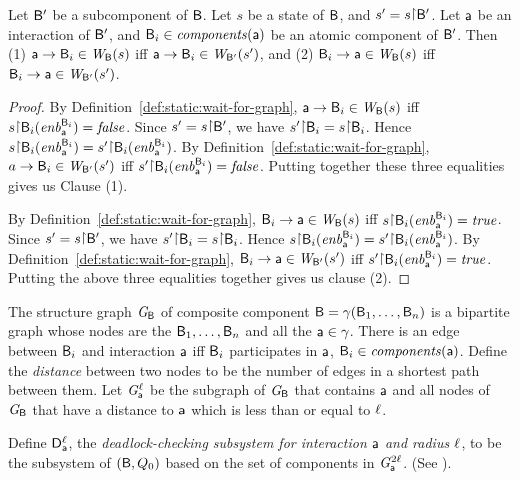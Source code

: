 \begin{proposition} \label{prop:edge-projection}
Let $\mathsf{B}'$ be a subcomponent of $\mathsf{B}$. Let $s$ be a state of
$\mathsf{B}$, and $s' = s \pj \B'$.  Let $\mathsf{a}$ be an interaction of
$\mathsf{B}'$, and $\mathsf{B}_i \in \mathit{components}(\mathsf{a})$ be an atomic component of
$\mathsf{B}'$.  Then (1) $\mathsf{a} \rightarrow \mathsf{B}_i \in \mathit{W}_{\mathsf{B}}({s})$ iff
$\mathsf{a} \rightarrow \mathsf{B}_i \in \mathit{W}_{\mathsf{B}'}({s'})$, and (2)
$\mathsf{B}_i \rightarrow \mathsf{a} \in \mathit{W}_{\mathsf{B}}({s})$ iff $\mathsf{B}_i \rightarrow \mathsf{a} \in \mathit{W}_{\mathsf{B}'}({s'})$.
\end{proposition}
%
\begin{proof}
By Definition~\ref{def:static:wait-for-graph}, $\mathsf{a} \rightarrow \mathsf{B}_i \in \mathit{W}_{\mathsf{B}}({s})$ iff $s \pj \B_i (\gd{\act}{\B_i}) = \false$.
Since $s' = s \pj \B'$, we have $s' \pj \B_i = s \pj \B_i$. Hence
$s \pj \B_i (\gd{\act}{\B_i}) = s' \pj \B_i (\gd{\act}{\B_i})$.
By Definition~\ref{def:static:wait-for-graph}, 
$a \rightarrow \mathsf{B}_i \in \mathit{W}_{\mathsf{B}'}({s'})$ iff $s' \pj \B_i (\gd{\act}{\B_i}) = \false$.
Putting together these three equalities gives us Clause (1).

By Definition~\ref{def:static:wait-for-graph},
$\mathsf{B}_i \rightarrow \mathsf{a} \in \mathit{W}_{\mathsf{B}}({s})$ iff 
$s \pj \B_i (\gd{\act}{\B_i}) = \true$.
Since $s' = s \pj \B'$, we have $s' \pj \B_i = s \pj \B_i$. Hence
$s \pj \B_i (\gd{\act}{\B_i}) = s' \pj \B_i (\gd{\act}{\B_i})$.
By Definition~\ref{def:static:wait-for-graph},
$\mathsf{B}_i \rightarrow \mathsf{a} \in \mathit{W}_{\mathsf{B}'}({s'})$ iff $s' \pj \B_i (\gd{\act}{\B_i}) = \true$.
Putting the above three equalities together gives us clause (2).
\end{proof}




\begin{definition} \label{def:structure-graph} The structure
graph $\mathit{G}_{\mathsf{B}}$ of composite component $\mathsf{B} = \gamma(\mathsf{B}_1,\dots,\mathsf{B}_n)$ is a
bipartite graph whose nodes are the $\mathsf{B}_1, \ldots, \mathsf{B}_n$ and all the
$\mathsf{a} \in \gamma$.  There is an edge between $\mathsf{B}_i$ and
interaction $\mathsf{a}$ iff $\mathsf{B}_i$ participates in $\mathsf{a}$, \ie $\mathsf{B}_i \in \mathit{components}(\mathsf{a})$.  Define the
\emph{distance} between two nodes to be the number of edges in a shortest path
between them.  Let $\mathit{G}_{\mathsf{a}}^{\ell}$ be the subgraph
of $\mathit{G}_{\mathsf{B}}$ that contains $\mathsf{a}$ and all nodes of $\mathit{G}_{\mathsf{B}}$
that have a distance to $\mathsf{a}$ which is less than or equal to $\ell$.
\end{definition}


\begin{definition} \label{def:dsk}
Define $\mathsf{D}_{\mathsf{a}}^{\ell}$, the \emph{deadlock-checking subsystem for interaction $\mathsf{a}$ and
radius $\ell$}, to be the subsystem of $(\mathsf{B}, Q_0)$ based on the set of %
components in $\mathit{G}_{\mathsf{a}}^{2\ell}$.  (See ).
\end{definition}

